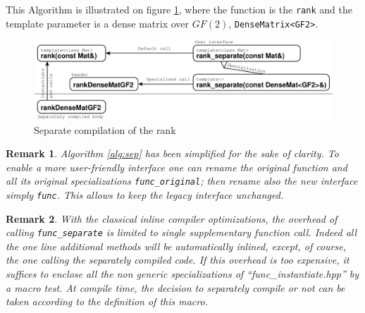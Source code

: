\documentclass{article}
\newtheorem{remark}{Remark}
\begin{document}
This Algorithm is illustrated on figure \ref{fig:sep}, where
the function is the \texttt{rank} and the template parameter is a dense
matrix over $GF(2)$,
\texttt{DenseMatrix<GF2>}.
\begin{figure}[ht]
\includegraphics[width=\textwidth]{separate}
\caption{Separate compilation of the rank}\label{fig:sep}
\end{figure}

\begin{remark} 
  Algorithm \ref{alg:sep} has been simplified for the
  sake of clarity. To enable a more user-friendly interface one can
  rename the original function and all its 
  original specializations \texttt{func\_original}; then rename also
  the new interface
 simply \texttt{func}. 
This allows to keep the legacy interface unchanged. 
\end{remark}

\begin{remark} 
With the classical inline compiler optimizations, the overhead of
calling \texttt{func\_separate} is limited to single supplementary
function call. Indeed all the one line additional methods will be
automatically inlined, except, of course, the one calling the separately
compiled code.
If this overhead is too expensive, it suffices to enclose all the non generic specializations of
``func\_instantiate.hpp'' by a macro test. 
At compile time, the decision to separately
compile or not can be taken according to the definition of this
macro. 
\end{remark}
\end{document}
